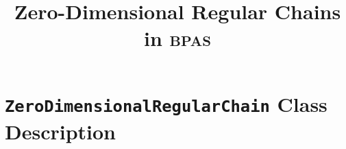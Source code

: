 \documentclass{article}
\title{Zero-Dimensional Regular Chains in \textsc{bpas}}
\date{}
\begin{document}
\maketitle{}

\section{\texttt{ZeroDimensionalRegularChain} Class Description}




\end{document}
